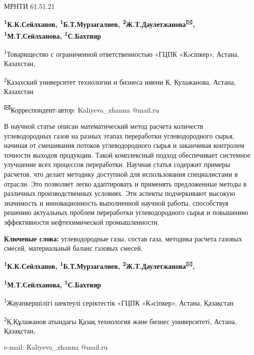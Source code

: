 \newpage
МРНТИ 61.51.21


\begin{center}
{\bfseries \textsuperscript{1}К.К.Сейлханов,
\textsuperscript{1}Б.Т.Мурзагалиев,
\textsuperscript{2}Ж.Т.Даулетжанова\textsuperscript{🖂}, \textsuperscript{1}М.Т.Сейлханова, \textsuperscript{1}С.Бахтияр}

\textsuperscript{1}Товарищество с ограниченной ответственностью «ГЦПК
«Кəсіпкер», Астана, Казахстан,

\textsuperscript{2}Казахский университет технологии и бизнеса имени К.
Кулажанова, Астана, Казахстан

{\bfseries \textsuperscript{🖂}}Корреспондент-автор: Kaliyeva\_zhanna
@mail.ru
\end{center}

В научной статье описан математический метод расчета количеств
углеводородных газов на разных этапах переработки углеводородного сырья,
начиная от смешивания потоков углеводородного сырья и заканчивая
контролем точности выходов продукции. Такой комплексный подход
обеспечивает системное улучшение всех процессов переработки. Научная
статья содержит примеры расчетов, что делает методику доступной для
использования специалистами в отрасли. Это позволяет легко адаптировать
и применять предложенные методы в различных производственных условиях.
Эти аспекты подчеркивают высокую значимость и инновационность
выполненной научной работы, способствуя решению актуальных проблем
переработки углеводородного сырья и повышению эффективности
нефтехимической промышленности.

{\bfseries Ключевые слова:} углеводородные газы, состав газа, методика
расчета газовых смесей, материальный баланс газовых смесей.


\begin{center}
{\bfseries \textsuperscript{1}К.К.Сейлханов,
\textsuperscript{1}Б.Т.Мурзагалиев,
\textsuperscript{2}Ж.Т.Даулетжанова\textsuperscript{🖂},}

{\bfseries \textsuperscript{1}М.Т.Сейлханова, \textsuperscript{1}С.Бахтияр}

\textsuperscript{1}Жауапкершілігі шектеулі серіктестік «ГЦПК «Кəсіпкер»,
Астана, Қазақстан

\textsuperscript{2}Қ.Құлажанов атындағы Қазақ технология және бизнес
университеті, Астана, Қазақстан,

e-mail: Kaliyeva\_zhanna @mail.ru
\end{center}

